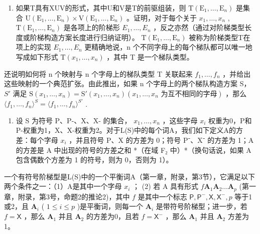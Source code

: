 \begin{enumerate}
\def\labelenumi{(\roman{enumi})}
\setcounter{enumi}{2}
\tightlist
\item
  如果T具有XUV的形式，其中U和V是T的前驱组装，则 \(\mathrm{T}(\mathrm{E}_{1},\ldots,\mathrm{E}_{n})\) 是集合 \(\mathrm{U}(\mathrm{E}_{1},\ldots,\mathrm{E}_{n})\times\mathrm{V}(\mathrm{E}_{1},\ldots,\mathrm{E}_{n})\) 。证明，对于每个关于 \(x_{1},\ldots,x_{n}\) , \(\mathrm{T}(\mathrm{E}_{1},\ldots,\mathrm{E}_{n})\) 是各项上的阶梯形 \(E_{1},\ldots,E_{n}\) ，反之亦然（通过对阶梯类型长度或阶梯构造方案长度进行归纳证明）。 \(\mathrm{T}(\mathrm{E}_{1},\ldots,\mathrm{E}_{n})\) 被称为阶梯类型T在项上的实现 \(E_{1},\ldots,E_{n}\) 更精确地说，n 个不同字母上的每个梯队都可以唯一地写成如下形式 \(\mathrm{T}(x_{1},\ldots,x_{n})\) ，其中 T 是一个梯队类型。
\end{enumerate}

还说明如何将 n 个映射与 n 个字母上的梯队类型 T 关联起来 \(f_{1}, \ldots, f_{n}\) ，并给出这些映射的一个典范扩张。由此推出，如果 n 个字母上的两个梯队构造方案 S， \(S'\) 满足 \(\mathrm{S}(x_{1}, \ldots, x_{n}) = \mathrm{S}'(x_{1}, \ldots, x_{n}) (x_{1}, \ldots, x_{n} \text{ 为互不相同的字母})\) ，那么 \(\langle f_{1}, \ldots, f_{n} \rangle^{S} = \langle f_{1}, \ldots, f_{n} \rangle^{S'}\) .

\exercisegroup

\begin{enumerate}
\def\labelenumi{\arabic{enumi}.}
\tightlist
\item
  设 S 为符号 P、P-、X、X- 的集合， \(x_1, \ldots, x_n\) ，这些字母 \(x_i\) 权重为0，P和P-权重为1，X、X-权重为2。对于L(S)中的每个词A，我们如下定义A的方差：每个字母 \(x_i\) ，并且符号 P、X 的方差为 0；符号 P⁻、X⁻ 的方差为 1；A 的方差是 A 中出现的符号的方差之和 *（在域 F₂ 中）*（换句话说，如果 A 包含偶数个方差为 1 的符号，则为 0，否则为 1）。
\end{enumerate}

一个有符号阶梯型是L(S)中的一个平衡词A（第一章，附录，第3节），它满足以下两个条件之一：（1）A是其中一个字母 \(x_i\) ； (2) 若 A 具有形式 \(f\mathbf{A}_1\mathbf{A}_2 \ldots \mathbf{A}_p\) (第一章，附录，第3号，命题2的推论2)，其中 \(f\) 是其中一个标志 \(\mathsf{P}, \mathsf{P}^{-}, \mathsf{X}, \mathsf{X}^{-}, p\) 等于1或2，且 \(\mathbf{A}_i\) ( \(1 \leqslant i \leqslant p\) )是平衡词，则每一个 \(\mathbf{A}_i\) 是带符号阶梯型；进一步，若 \(f = \mathsf{X}\) ，那么 \(\mathbf{A}_1\) 并且 \(\mathbf{A}_2\) 的方差为0，且若 \(f = \mathsf{X}^{-}\) ，那么 \(\mathbf{A}_1\) 并且 \(\mathbf{A}_2\) 方差为1。


